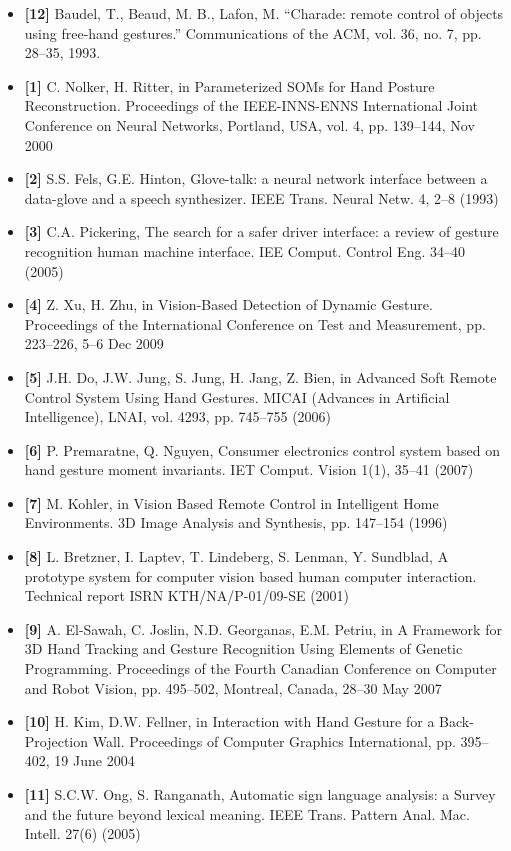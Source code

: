 \documentclass[12pt, a4paper]{article}
\begin{document}
\begin{itemize}[label=]
    \item \textbf{[12]} Baudel, T., Beaud, M. B., Lafon, M. “Charade: remote control of objects using free-hand gestures.” Communications of the ACM, vol. 36, no. 7, pp. 28–35, 1993.
    \item \textbf{[1]} C. Nolker, H. Ritter, in Parameterized SOMs for Hand Posture Reconstruction. Proceedings of the IEEE-INNS-ENNS International Joint Conference on Neural Networks, Portland, USA, vol. 4, pp. 139–144, Nov 2000
    \item \textbf{[2]} S.S. Fels, G.E. Hinton, Glove-talk: a neural network interface between a data-glove and a speech synthesizer. IEEE Trans. Neural Netw. 4, 2–8 (1993)
    \item \textbf{[3]} C.A. Pickering, The search for a safer driver interface: a review of gesture recognition human machine interface. IEE Comput. Control Eng. 34–40 (2005)
    \item \textbf{[4]} Z. Xu, H. Zhu, in Vision-Based Detection of Dynamic Gesture. Proceedings of the International Conference on Test and Measurement, pp. 223–226, 5–6 Dec 2009
    \item \textbf{[5]} J.H. Do, J.W. Jung, S. Jung, H. Jang, Z. Bien, in Advanced Soft Remote Control System Using Hand Gestures. MICAI (Advances in Artificial Intelligence), LNAI, vol. 4293, pp. 745–755 (2006)
    \item \textbf{[6]} P. Premaratne, Q. Nguyen, Consumer electronics control system based on hand gesture moment invariants. IET Comput. Vision 1(1), 35–41 (2007)
    \item \textbf{[7]} M. Kohler, in Vision Based Remote Control in Intelligent Home Environments. 3D Image Analysis and Synthesis, pp. 147–154 (1996)
    \item \textbf{[8]} L. Bretzner, I. Laptev, T. Lindeberg, S. Lenman, Y. Sundblad, A prototype system for computer vision based human computer interaction. Technical report ISRN KTH/NA/P-01/09-SE (2001)
    \item \textbf{[9]} A. El-Sawah, C. Joslin, N.D. Georganas, E.M. Petriu, in A Framework for 3D Hand Tracking and Gesture Recognition Using Elements of Genetic Programming. Proceedings of the Fourth Canadian Conference on Computer and Robot Vision, pp. 495–502, Montreal, Canada, 28–30 May 2007
    \item \textbf{[10]} H. Kim, D.W. Fellner, in Interaction with Hand Gesture for a Back-Projection Wall. Proceedings of Computer Graphics International, pp. 395–402, 19 June 2004
    \item \textbf{[11]} S.C.W. Ong, S. Ranganath, Automatic sign language analysis: a Survey and the future beyond lexical meaning. IEEE Trans. Pattern Anal. Mac. Intell. 27(6) (2005)

\end{itemize}
\end{document}
